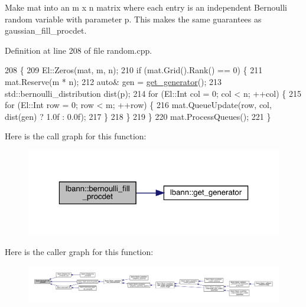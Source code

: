Make mat into an m x n matrix where each entry is an independent Bernoulli random variable with parameter p. This makes the same guarantees as gaussian\+\_\+fill\+\_\+procdet. 

Definition at line 208 of file random.\+cpp.


\begin{DoxyCode}
208                                                                          \{
209   El::Zeros(mat, m, n);
210   \textcolor{keywordflow}{if} (mat.Grid().Rank() == 0) \{
211     mat.Reserve(m * n);
212     \textcolor{keyword}{auto}& gen = \hyperlink{namespacelbann_a4fea7ba21017b49d1e34394b4c20c764}{get\_generator}();
213     std::bernoulli\_distribution dist(p);
214     \textcolor{keywordflow}{for} (El::Int col = 0; col < n; ++col) \{
215       \textcolor{keywordflow}{for} (El::Int row = 0; row < m; ++row) \{
216         mat.QueueUpdate(row, col, dist(gen) ? 1.0f : 0.0f);
217       \}
218     \}
219   \}
220   mat.ProcessQueues();
221 \}
\end{DoxyCode}
Here is the call graph for this function\+:\nopagebreak
\begin{figure}[H]
\begin{center}
\leavevmode
\includegraphics[width=323pt]{namespacelbann_ad1e3fe84cfa5257be476de3be805064d_cgraph}
\end{center}
\end{figure}
Here is the caller graph for this function\+:\nopagebreak
\begin{figure}[H]
\begin{center}
\leavevmode
\includegraphics[width=350pt]{namespacelbann_ad1e3fe84cfa5257be476de3be805064d_icgraph}
\end{center}
\end{figure}
\mbox{\label{namespacelbann_a3ee4a1fa7a82c30999de9eb626c68311}} 
